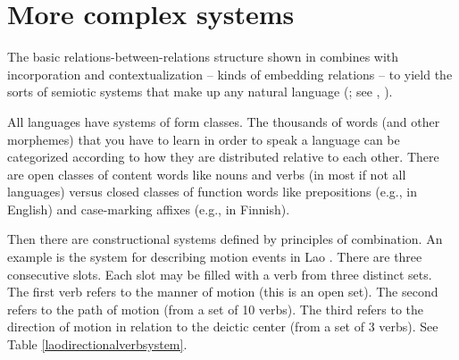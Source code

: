 
\section{More complex systems}


The basic relations-between-relations structure shown in  combines with incorporation and contextualization -- kinds of embedding relations -- to yield the sorts of semiotic systems that make up any natural language 
(\citealt{saussure_cours_1916}; see \citealt{dixon_basic_2010,dixon_basics_2014}, \citealt{bickel_linguistic_2014}). 



All languages have systems of form classes. The thousands of 
words (and other morphemes) that you have to learn in order to 
speak a language can be categorized according to how they are
distributed relative to each other. There are open classes of 
content words like nouns and verbs (in most if not all languages) versus closed classes of function 
words like prepositions (e.g., in English) and case-marking affixes 
(e.g., in Finnish). 



Then there are constructional systems defined by principles of combination. An example is the system for describing motion 
events in Lao \citep[387--389]{enfield_grammar_2007}. There are three consecutive 
slots. Each slot may be filled with a 
verb from three distinct sets. The first verb refers to the manner of 
motion (this is an open set). The second refers to the path of motion 
(from a set of 10 verbs). The third refers to the 
direction of motion in relation to the deictic center (from a set 
of 3 verbs). See Table \ref{laodirectionalverbsystem}.


